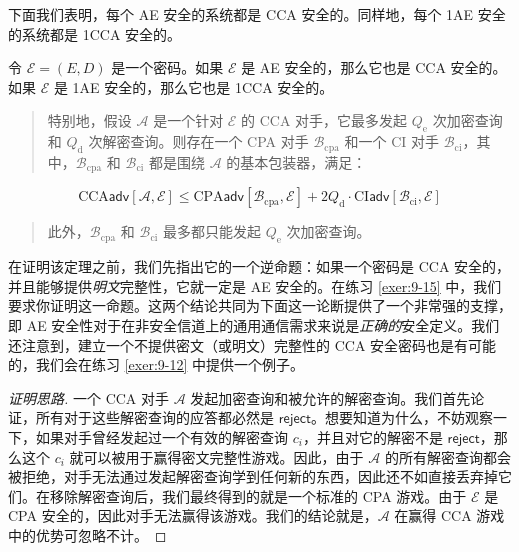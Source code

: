 下面我们表明，每个 AE 安全的系统都是 CCA 安全的。同样地，每个 1AE 安全的系统都是 1CCA 安全的。

\begin{theorem}\label{theo:9-1}
令 $\mathcal{E}=(E,D)$ 是一个密码。如果 $\mathcal{E}$ 是 AE 安全的，那么它也是 CCA 安全的。如果 $\mathcal{E}$ 是 1AE 安全的，那么它也是 1CCA 安全的。
\begin{quote}
特别地，假设 $\mathcal{A}$ 是一个针对 $\mathcal{E}$ 的 CCA 对手，它最多发起 $Q_\mathrm{e}$ 次加密查询和 $Q_\mathrm{d}$ 次解密查询。则存在一个 CPA 对手 $\mathcal{B}_\mathrm{cpa}$ 和一个 CI 对手 $\mathcal{B}_\mathrm{ci}$，其中，$\mathcal{B}_\mathrm{cpa}$ 和 $\mathcal{B}_\mathrm{ci}$ 都是围绕 $\mathcal{A}$ 的基本包装器，满足：
\end{quote}
\begin{equation}\label{eq:9-3}
\mathrm{CCA}\mathsf{adv}[\mathcal{A},\mathcal{E}]
\leq
\mathrm{CPA}\mathsf{adv}[\mathcal{B}_\mathrm{cpa},\mathcal{E}]+
2Q_\mathrm{d}\cdot
\mathrm{CI}\mathsf{adv}[\mathcal{B}_\mathrm{ci},\mathcal{E}]
\end{equation}
\begin{quote}
此外，$\mathcal{B}_\mathrm{cpa}$ 和 $\mathcal{B}_\mathrm{ci}$ 最多都只能发起 $Q_\mathrm{e}$ 次加密查询。
\end{quote}
\end{theorem}

在证明该定理之前，我们先指出它的一个逆命题：如果一个密码是 CCA 安全的，并且能够提供\emph{明文}完整性，它就一定是 AE 安全的。在练习 \ref{exer:9-15} 中，我们要求你证明这一命题。这两个结论共同为下面这一论断提供了一个非常强的支撑，即 AE 安全性对于在非安全信道上的通用通信需求来说是\emph{正确的}安全定义。我们还注意到，建立一个不提供密文（或明文）完整性的 CCA 安全密码也是有可能的，我们会在练习 \ref{exer:9-12} 中提供一个例子。

\begin{proof}[证明思路]
一个 CCA 对手 $\mathcal{A}$ 发起加密查询和被允许的解密查询。我们首先论证，所有对于这些解密查询的应答都必然是 $\mathsf{reject}$。想要知道为什么，不妨观察一下，如果对手曾经发起过一个有效的解密查询 $c_i$，并且对它的解密不是 $\mathsf{reject}$，那么这个 $c_i$ 就可以被用于赢得密文完整性游戏。因此，由于 $\mathcal{A}$ 的所有解密查询都会被拒绝，对手无法通过发起解密查询学到任何新的东西，因此还不如直接丢弃掉它们。在移除解密查询后，我们最终得到的就是一个标准的 CPA 游戏。由于 $\mathcal{E}$ 是 CPA 安全的，因此对手无法赢得该游戏。我们的结论就是，$\mathcal{A}$ 在赢得 CCA 游戏中的优势可忽略不计。
\end{proof}

